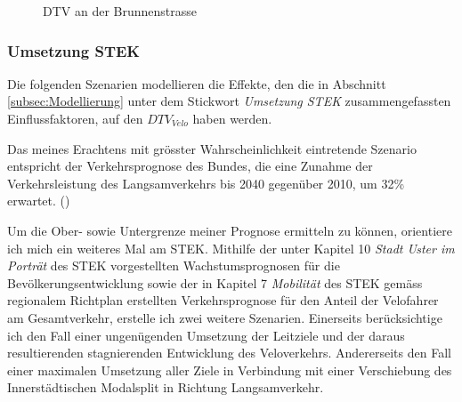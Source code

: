 \begin{figure}[h!]
  \centering
  \hfill
\caption[DTV Brunnenstrasse]{DTV an der Brunnenstrasse}
  \label{fig:DTV}
\end{figure}



\subsubsection*{Umsetzung STEK}
\label{subsubsec:Umsetzung}

Die folgenden Szenarien modellieren die Effekte, den die in Abschnitt \ref{subsec:Modellierung} unter dem Stickwort \textit{Umsetzung STEK} zusammengefassten Einflussfaktoren, auf den $DTV_{Velo}$ haben werden. 

Das meines Erachtens mit grösster Wahrscheinlichkeit eintretende Szenario entspricht der Verkehrsprognose des Bundes, die eine Zunahme der Verkehrsleistung des Langsamverkehrs bis 2040 gegenüber 2010, um 32\% erwartet. (\cite{Perspektive2040}) 

Um die Ober- sowie Untergrenze meiner Prognose ermitteln zu können, orientiere ich mich ein weiteres Mal am STEK. Mithilfe der unter Kapitel 10 \textit{Stadt Uster im Porträt} des STEK vorgestellten Wachstumsprognosen für die Bevölkerungsentwicklung sowie der in Kapitel 7 \textit{Mobilität} des STEK gemäss regionalem Richtplan erstellten Verkehrsprognose für den Anteil der Velofahrer am Gesamtverkehr, erstelle ich zwei weitere Szenarien. 
Einerseits berücksichtige ich den Fall einer ungenügenden Umsetzung der Leitziele und der daraus resultierenden stagnierenden Entwicklung des Veloverkehrs. Andererseits den Fall einer maximalen Umsetzung aller Ziele in Verbindung mit einer Verschiebung des Innerstädtischen Modalsplit in Richtung Langsamverkehr.

